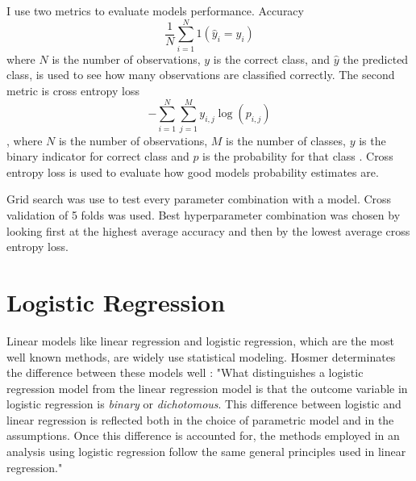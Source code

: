 I use two metrics to evaluate models performance. Accuracy
\begin{equation}
    \frac { 1 } { N} \sum _ { i = 1 } ^ {N} 1 \left( \hat { y } _ { i } = y _ { i } \right)
\end{equation}
where $N$ is the number of observations, $y$ is the correct class, and $\hat { y }$ the predicted class, is used to see how many observations are classified correctly. The second metric is cross entropy loss
\begin{equation}
    - \sum _ { i = 1 } ^ { N }\sum _ { j = 1 } ^ { M } y _ { i,j } \log \left( p _ { i,j } \right)
\end{equation}, where $N$ is the number of observations, $M$ is the number of classes, $y$ is the binary indicator for correct class and $p$ is the probability for that class \cite{nasrabadi2007pattern}. Cross entropy loss is used to evaluate how good models probability estimates are.

Grid search was use to test every parameter combination with a model. Cross validation of 5 folds was used. Best hyperparameter combination was chosen by looking first at the highest average accuracy and then by the lowest average cross entropy loss.

\section{Logistic Regression}
Linear models like linear regression and logistic regression, which are the most well known methods, are widely use statistical modeling. Hosmer determinates the difference between these models well \cite{hosmer2013applied}: "What distinguishes a logistic regression model from  the linear regression model is that the outcome variable in logistic regression is \textit{binary} or \textit{dichotomous}. This difference between logistic and linear regression is reflected both in the choice of parametric model and in the assumptions. Once this difference is accounted for, the methods employed in an analysis using logistic regression follow the same general principles used in linear regression."

